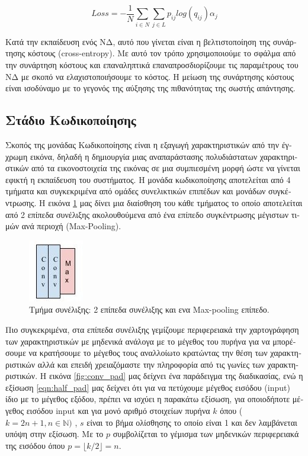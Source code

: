 \begin{equation}
\label{eqn:loss_func}
 \mathit{Loss} = - \frac{1}{N} \sum_{i\in N} \sum_{j\in L} p_{ij} log(q_{ij}) \alpha_{j}
\end{equation}

\textgreek{Κατά την εκπαίδευση ενός ΝΔ, αυτό που γίνεται είναι η βελτιστοποίηση της συνάρτησης κόστους }(cross-entropy). \textgreek{Με αυτό τον τρόπο χρησιμοποιούμε το σφάλμα από την συνάρτηση κόστους και επαναληπτικά επαναπροσδιορίζουμε τις παραμέτρους του ΝΔ με σκοπό να ελαχιστοποιήσουμε το κόστος. Η μείωση της συνάρτησης κόστους είναι ισοδύναμο με το γεγονός της αύξησης της πιθανότητας της σωστής απάντησης. }

\subsection{\textgreek{Στάδιο Κωδικοποίησης}}
\textgreek{Σκοπός της μονάδας Κωδικοποίησης είναι η εξαγωγή χαρακτηριστικών από την έγχρωμη εικόνα, δηλαδή η δημιουργία μιας αναπαράστασης πολυδιάστατων χαρακτηριστικών από τα εικονοστοιχεία της εικόνας σε μια συμπιεσμένη μορφή ώστε να γίνεται εφικτή η εκπαίδευση του συστήματος. Η μονάδα κωδικοποίησης αποτελείται από 4 τμήματα και συγκεκριμένα από ομάδες συνελικτικών επιπέδων και μονάδων συγκέντρωσης. Η εικόνα }\ref{fig:conv_block} \textgreek{μας δίνει μια διαίσθηση του κάθε τμήματος το οποίο αποτελείται από 2 επίπεδα συνέλιξης ακολουθούμενα από ένα επίπεδο συγκέντρωσης μέγιστων τιμών ανά περιοχή }(Max-Pooling). 


\begin{figure}[H]
 \centering
 \includegraphics[scale=0.6]{Images/conv_block}
  \caption[\textgreek{Τμήμα Συνέλιξης}]{\textgreek{Τμήμα συνέλιξης: 2 επίπεδα συνέλιξης και ενα }Max-pooling \textgreek{επίπεδο.}}
 \label{fig:conv_block}
\end{figure}

\textgreek{Πιο συγκεκριμένα, στα επίπεδα συνέλιξης γεμίζουμε περιφερειακά την χαρτογράφηση των χαρακτηριστικών με μηδενικά ανάλογα με το μέγεθος του πυρήνα για να μπορέσουμε να κρατήσουμε το μέγεθος τους αναλλοίωτο κρατώντας την θέση των χαρακτηριστικών αλλά και επειδή χρειαζόμαστε την πληροφορία από τις γωνίες των χαρακτηριστικών. Η εικόνα }\ref{fig:conv_pad} \textgreek{μας δείχνει ένα παράδειγμα της διαδικασίας, ενώ η εξίσωση }\ref{eqn:half_pad} \textgreek{μας δείχνει ότι για να πετύχουμε μέγεθος εισόδου }(input) \textgreek{ίδιο με το μέγεθος εξόδου, πρέπει να ισχύει η παρακάτω εξίσωση, για οποιοδήποτε μέγεθος εισόδου }input \textgreek{και για μονό αριθμό στοιχείων πυρήνα $k$ όπου }($k = 2n + 1, n \in  \mathbb{N})$  \textgreek{, $s$ είναι το βήμα ολίσθησης το οποίο είναι 1 και δεν λαμβάνεται υπόψη στην εξίσωση. Με το }$p$ \textgreek{συμβολίζεται το γέμισμα των μηδενικών περιφερειακά της εισόδου όπου }$p = \lfloor k/2 \rfloor = n$.

